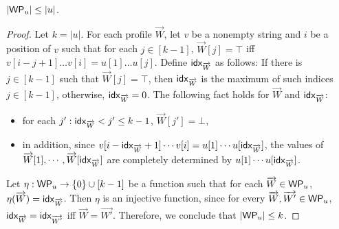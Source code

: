 
\begin{proposition}
$|\mathsf{WP}_{u}| \le |u|$.
\end{proposition}
%
\begin{proof}
Let $k=|u|$. For each profile $\overrightarrow{W}$, let $v$ be a nonempty string and $i$ be a position of $v$ such that for each $j \in [k-1]$, $\overrightarrow{W}[j] = \top$ iff $v[i-j+1] \dots v[i] = u[1] \dots u[j]$. Define ${\sf idx}_{\overrightarrow{W}}$ as follows: If there is $j \in [k-1]$ such that $\overrightarrow{W}[j]=\top$, then ${\sf idx}_{\overrightarrow{W}}$ is the maximum of such indices $j \in [k-1]$, otherwise, ${\sf idx}_{\overrightarrow{W}} =0$. The following fact holds for $\overrightarrow{W}$ and ${\sf idx}_{\overrightarrow{W}}$:
\begin{itemize}
	\item for each $j': {\sf idx}_{\overrightarrow{W}} < j' \le k-1$, $\overrightarrow{W}[j']=\bot$,
	\item in addition, since $v[i-{\sf idx}_{\overrightarrow{W}}+1] \cdots v[i] = u[1] \cdots u[{\sf idx}_{\overrightarrow{W}}]$, the values of $\overrightarrow{W}[1],\cdots, \overrightarrow{W}[{\sf idx}_{\overrightarrow{W}}]$ are completely determined by $u[1] \cdots u[{\sf idx}_{\overrightarrow{W}}]$.
\end{itemize}
Let $\eta: \mathsf{WP}_{u} \rightarrow \{0\} \cup [k-1]$ be a function such that for each $\overrightarrow{W} \in \mathsf{WP}_{u}$, $\eta(\overrightarrow{W})={\sf idx}_{\overrightarrow{W}}$. Then $\eta$ is an injective function, since for every $\overrightarrow{W}, \overrightarrow{W'} \in \mathsf{WP}_{u}$, ${\sf idx}_{\overrightarrow{W}}  = {\sf idx}_{\overrightarrow{W'}}$ iff $\overrightarrow{W} = \overrightarrow{W'}$. Therefore, we conclude that  $ |\mathsf{WP}_{u}| \le k$.
\end{proof}

